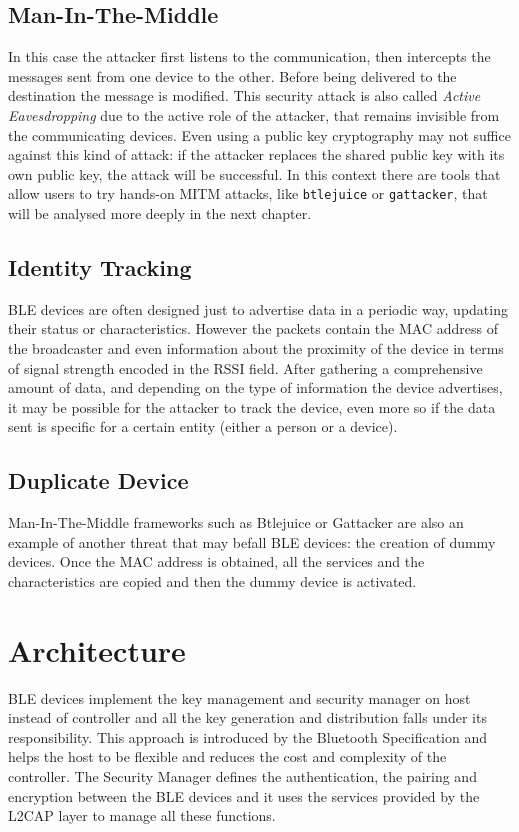 \subsection{Man-In-The-Middle}
In this case the attacker first listens to the communication, then intercepts the messages sent from one device to the other. Before being delivered to the destination the message is modified. This security attack is also called \textit{Active Eavesdropping} due to the active role of the attacker, that remains invisible from the communicating devices. Even using a public key cryptography may not suffice against this kind of attack: if the attacker replaces the shared public key with its own public key, the attack will be successful.
In this context there are tools that allow users to try hands-on MITM attacks, like \texttt{btlejuice} or \texttt{gattacker}, that will be analysed more deeply in the next chapter.

\subsection{Identity Tracking}
BLE devices are often designed just to advertise data in a periodic way, updating their status or characteristics. However the packets contain the MAC address of the broadcaster and even information about the proximity of the device in terms of signal strength encoded in the RSSI field.
After gathering a comprehensive amount of data, and depending on the type of information the device advertises, it may be possible for the attacker to track the device, even more so if the data sent is specific for a certain entity (either a person or a device).

\subsection{Duplicate Device}
Man-In-The-Middle frameworks such as Btlejuice or Gattacker are also an example of another threat that may befall BLE devices: the creation of dummy devices. Once the MAC address is obtained, all the services and the characteristics are copied and then the dummy device is activated.

\section{Architecture}
BLE devices implement the key management and security manager on host instead of controller and all the key generation and distribution falls under its responsibility.
This approach is introduced by the Bluetooth Specification and helps the host to be flexible and reduces the cost and complexity of the controller.
The Security Manager defines the authentication, the pairing and encryption between the BLE devices and it uses the services provided by the L2CAP layer to manage all these functions.


